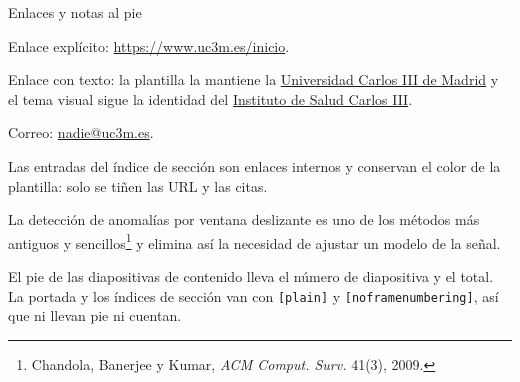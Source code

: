 \documentclass[aspectratio=169,9pt]{beamer}
\begin{document}
\begin{frame}{Enlaces y notas al pie}
\begin{twocols}

  Enlace explícito: \url{https://www.uc3m.es/inicio}.

  Enlace con texto: la plantilla la mantiene la
  \href{https://www.uc3m.es}{Universidad Carlos III de Madrid} y el tema
  visual sigue la identidad del
  \href{https://www.isciii.es}{Instituto de Salud Carlos III}.

  Correo: \href{mailto:nadie@uc3m.es}{nadie@uc3m.es}.


  Las entradas del índice de sección son enlaces internos y conservan el
  color de la plantilla: solo se tiñen las URL y las citas.
\nextcol

  La detección de anomalías por ventana deslizante es uno de los métodos
  más antiguos y sencillos\footnote{Chandola, Banerjee y Kumar,
  \emph{ACM Comput. Surv.} 41(3), 2009.} y elimina así la necesidad de
  ajustar un modelo de la señal.


  El pie de las diapositivas de contenido lleva el número de diapositiva y el
  total. La portada y los índices de sección van con \texttt{[plain]} y
  \texttt{[noframenumbering]}, así que ni llevan pie ni cuentan.
\end{twocols}
\end{frame}
\end{document}
